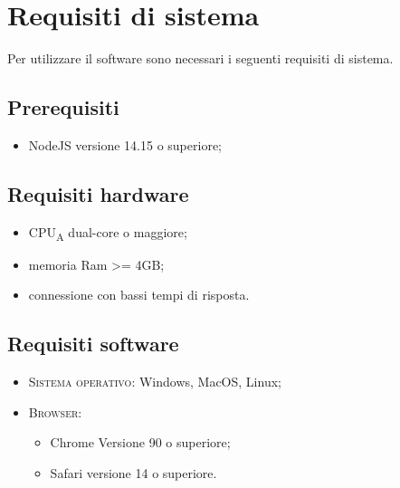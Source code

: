 \section{Requisiti di sistema}
Per utilizzare il software sono necessari i seguenti requisiti di sistema.
\subsection{Prerequisiti}
    \begin{itemize}
        \item NodeJS versione 14.15 o superiore;
    \end{itemize}
\subsection{Requisiti hardware}
\begin{itemize}
	\item CPU\textsubscript{A} dual-core o maggiore;
	\item memoria Ram >= 4GB;
	\item connessione con bassi tempi di risposta.
\end{itemize}
\subsection{Requisiti software}
\begin{itemize}
    \item \textsc{Sistema operativo}: Windows, MacOS, Linux;
    \item \textsc{Browser}: 
    \begin{itemize}
        \item Chrome Versione 90 o superiore;
        \item Safari versione 14 o superiore.
    \end{itemize}
\end{itemize}